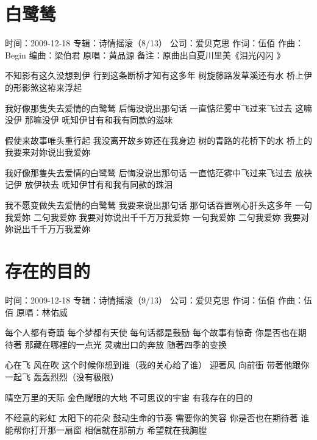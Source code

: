 \documentclass[UTF8,a4paper,oneside,twocolumn,12pt]{ctexbook}
\newcommand{\infopair}[2]{\textbullet #1：#2}
\newcommand{\zc}[1][伍佰]{\infopair{作词}{#1}}
\newcommand{\zq}[1][伍佰]{\infopair{作曲}{#1}}
\newcommand{\bq}[1][伍佰]{\infopair{编曲}{#1}}
\newcommand{\zj}[1]{\infopair{专辑}{#1}}
\newcommand{\yc}[1]{\infopair{原唱}{#1}}
\newcommand{\sj}[1]{\infopair{时间}{#1}}
\newcommand{\bz}[1]{\infopair{备注}{#1}}
\newcommand{\gs}[1]{\infopair{公司}{#1}}
\newenvironment{info}{\begin{flushleft}\kaishu
	}
	{\end{flushleft}\normalsize\yahei\par}
\newenvironment{lyric}{
	}
{}
\begin{document}
\section{白鹭鸶}
\begin{info}
	\sj{2009-12-18}
	\zj{诗情摇滚（8/13）}
	\gs{爱贝克思}
	\zc
	\zq[Begin]
	\bq[梁伯君]
	\yc{黄品源}
	\bz{原曲出自夏川里美《泪光闪闪 》}
\end{info}
\begin{lyric}
	不知影有这久没想到伊 行到这条断桥才知有这多年
	树旋藤路发草溪还有水 桥上伊的形影煞这袸来浮起

	我好像那隻失去爱情的白鹭鸶 后悔没说出那句话
	一直惦茫雾中飞过来飞过去 这嘛没伊 那嘛没伊
	呒知伊甘有和我有同款的滋味

	假使来故事唯头重行起 我没离开故乡妳还在我身边
	树的青路的花桥下的水 桥上的我要来对妳说出我爱妳

	我好像那隻失去爱情的白鹭鸶 后悔没说出那句话
	一直惦茫雾中飞过来飞过去 放袂记伊 放伊袂去
	呒知伊甘有和我有同款的珠泪

	我不愿变做失去爱情的白鹭鸶 我要来说出那句话
	那句话吞置咧心肝头这多年
	一句我爱妳 二句我爱妳 我要对妳说出千千万万我爱妳
	一句我爱妳 二句我爱妳 我要对妳说出千千万万我爱妳
\end{lyric}

\section{存在的目的}
\begin{info}
	\sj{2009-12-18}
	\zj{诗情摇滚（9/13）}
	\gs{爱贝克思}
	\zc
	\zq
	\yc{林佑威}
\end{info}
\begin{lyric}
	每个人都有奇蹟 每个梦都有天使
	每句话都是鼓励 每个故事有惊奇
	你是否也在期待著 那藏在哪裡的一点光
	灵魂出口的奔放 随著四季的变换

	心在飞 风在吹 这个时候你想到谁（我的关心给了谁）
	迎著风 向前衝 带著他跟你一起飞 轰轰烈烈（没有极限）

	晴空万里的天际 金色耀眼的大地
	不可思议的宇宙 有我存在的目的

	不经意的彩虹 太阳下的花朵
	鼓动生命的节奏 需要你的笑容
	你是否也在期待著 谁能帮你打开那一扇窗
	相信就在那前方 希望就在我胸膛
\end{lyric}
\end{document}
